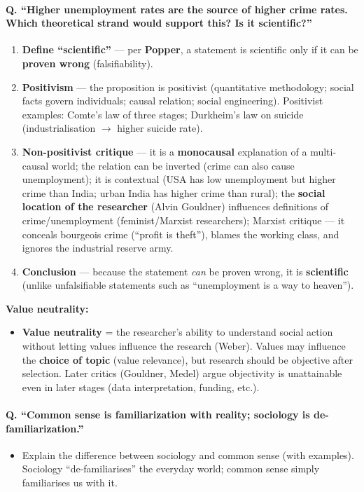 \paragraph{Q. ``Higher unemployment rates are the source of higher crime rates. Which theoretical strand would support this? Is it scientific?''}
\begin{enumerate}
\item \textbf{Define ``scientific''} --- per \textbf{Popper}, a statement is scientific only if it can be \textbf{proven wrong} (falsifiability).
\item \textbf{Positivism} --- the proposition is positivist (quantitative methodology; social facts govern individuals; causal relation; social engineering). Positivist examples: Comte's law of three stages; Durkheim's law on suicide (industrialisation $\rightarrow$ higher suicide rate).
\item \textbf{Non-positivist critique} --- it is a \textbf{monocausal} explanation of a multi-causal world; the relation can be inverted (crime can also cause unemployment); it is contextual (USA has low unemployment but higher crime than India; urban India has higher crime than rural); the \textbf{social location of the researcher} (Alvin Gouldner) influences definitions of crime/unemployment (feminist/Marxist researchers); Marxist critique --- it conceals bourgeois crime (``profit is theft''), blames the working class, and ignores the industrial reserve army.
\item \textbf{Conclusion} --- because the statement \textit{can} be proven wrong, it is \textbf{scientific} (unlike unfalsifiable statements such as ``unemployment is a way to heaven'').
\end{enumerate}

\begin{CriticalPoint}
\textbf{Value neutrality:}
\begin{itemize}
\item \textbf{Value neutrality} = the researcher's ability to understand social action without letting values influence the research (Weber). Values may influence the \textbf{choice of topic} (value relevance), but research should be objective after selection. Later critics (Gouldner, Medel) argue objectivity is unattainable even in later stages (data interpretation, funding, etc.).
\end{itemize}
\end{CriticalPoint}

\paragraph{Q. ``Common sense is familiarization with reality; sociology is de-familiarization.''}
\begin{itemize}
\item Explain the difference between sociology and common sense (with examples). Sociology ``de-familiarises'' the everyday world; common sense simply familiarises us with it.
\end{itemize}

